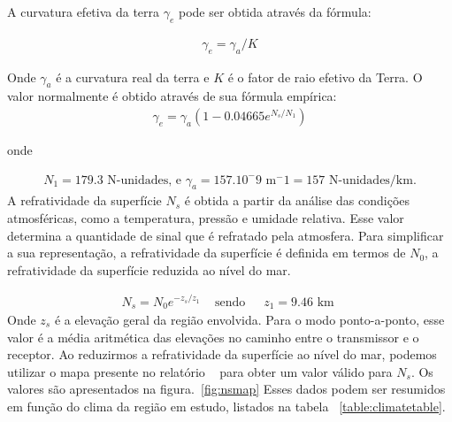 A curvatura efetiva da terra $\gamma_e$ pode ser obtida através da fórmula:

\begin{align}
\label{ge} \gamma_e = \gamma_a/K
\end{align}


Onde $\gamma_a$ é a curvatura real da terra e $K$ é o fator de raio efetivo da Terra. O valor normalmente é obtido através de sua fórmula empírica:
\begin{align}
\label{ge2} \gamma_e = \gamma_a(1-0.04665e^{N_s/N_1})
\end{align}

onde

\begin{align}
\label{n_1} N_1 = 179.3 \text{ N-unidades, e } \gamma_a = 157 . 10^-9 \text{ m} ^-1 = 157 \text{ N-unidades/km.}
\end{align}
A refratividade da superfície \begin{math}N_s\end{math} é obtida a partir da análise das condições atmosféricas, como a temperatura, pressão e umidade relativa. Esse valor determina a quantidade de sinal que é refratado pela atmosfera.
Para simplificar a sua representação, a refratividade da superfície  é definida em termos de \begin{math}N_0\end{math}, a refratividade da superfície reduzida ao nível do mar.

\begin{align}
\label{ns} N_s = N_0e^{-z_s/z_1} \,\,\,\,\, \text{ sendo} \,\,\,\,\,\,\,\,\, z_1 = 9.46 \text{ km }
\end{align}
Onde \begin{math}z_s\end{math} é a elevação geral da região envolvida. Para o modo ponto-a-ponto, esse valor é a média aritmética das elevações no caminho entre o transmissor e o receptor.
Ao reduzirmos a refratividade da superfície ao nível do mar, podemos utilizar o mapa presente no relatório ~\cite{longleyricedelta} para obter um valor válido para \begin{math}N_s\end{math}. Os valores são apresentados na figura.~\ref{fig:nsmap} Esses dados podem ser resumidos em função do clima da região em estudo, listados na tabela ~\ref{table:climatetable}.



